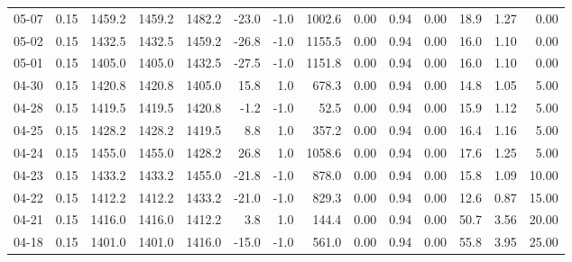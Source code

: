 \begin{threeparttable}
{\begin{tabular}{lrrrrrrrrrrrrr}
  05-07 &     0.15 & 1459.2 & 1459.2 & 1482.2 &      -23.0 &                     -1.0 &              1002.6 &       0.00 &      0.94 &           0.00 &             18.9 &            1.27 &                   0.00 \\
  05-02 &     0.15 & 1432.5 & 1432.5 & 1459.2 &      -26.8 &                     -1.0 &              1155.5 &       0.00 &      0.94 &           0.00 &             16.0 &            1.10 &                   0.00 \\
  05-01 &     0.15 & 1405.0 & 1405.0 & 1432.5 &      -27.5 &                     -1.0 &              1151.8 &       0.00 &      0.94 &           0.00 &             16.0 &            1.10 &                   0.00 \\
  04-30 &     0.15 & 1420.8 & 1420.8 & 1405.0 &       15.8 &                      1.0 &               678.3 &       0.00 &      0.94 &           0.00 &             14.8 &            1.05 &                   5.00 \\
  04-28 &     0.15 & 1419.5 & 1419.5 & 1420.8 &       -1.2 &                     -1.0 &                52.5 &       0.00 &      0.94 &           0.00 &             15.9 &            1.12 &                   5.00 \\
  04-25 &     0.15 & 1428.2 & 1428.2 & 1419.5 &        8.8 &                      1.0 &               357.2 &       0.00 &      0.94 &           0.00 &             16.4 &            1.16 &                   5.00 \\
  04-24 &     0.15 & 1455.0 & 1455.0 & 1428.2 &       26.8 &                      1.0 &              1058.6 &       0.00 &      0.94 &           0.00 &             17.6 &            1.25 &                   5.00 \\
  04-23 &     0.15 & 1433.2 & 1433.2 & 1455.0 &      -21.8 &                     -1.0 &               878.0 &       0.00 &      0.94 &           0.00 &             15.8 &            1.09 &                  10.00 \\
  04-22 &     0.15 & 1412.2 & 1412.2 & 1433.2 &      -21.0 &                     -1.0 &               829.3 &       0.00 &      0.94 &           0.00 &             12.6 &            0.87 &                  15.00 \\
  04-21 &     0.15 & 1416.0 & 1416.0 & 1412.2 &        3.8 &                      1.0 &               144.4 &       0.00 &      0.94 &           0.00 &             50.7 &            3.56 &                  20.00 \\
  04-18 &     0.15 & 1401.0 & 1401.0 & 1416.0 &      -15.0 &                     -1.0 &               561.0 &       0.00 &      0.94 &           0.00 &             55.8 &            3.95 &                  25.00 \\

\end{tabular}}
\end{threeparttable}
